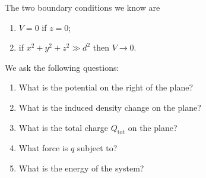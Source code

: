 \documentclass[12pt]{extarticle}
\begin{document}
The two boundary conditions we know are
\begin{enumerate}
    \item $V = 0$ if $z = 0$;
    \item if $x^2 + y^2 + z^2 \gg d^2$ then $V \to 0$.
\end{enumerate}

We ask the following questions:
\begin{enumerate}[label=\alph*)]
    \item What is the potential on the right of the plane?
    \item What is the induced density change on the plane?
    \item What is the total charge $Q_\text{tot}$ on the plane?
    \item What force is $q$ subject to?
    \item What is the energy of the system?
\end{enumerate}
\end{document}
